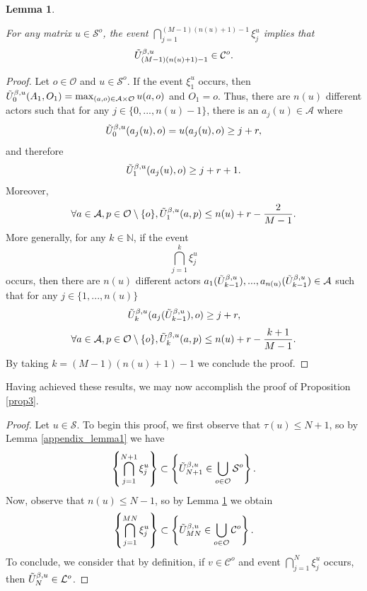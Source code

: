 \documentclass[11pt]{article}
\newtheorem{lemma}[theorem]{Lemma}
\theoremstyle{definition}
\newcommand{\st}{\mathcal{S}}
\newcommand{\A}{\mathcal{A}}
\newcommand{\opn}{\mathcal{O}}
\begin{document}
\begin{lemma}\label{appendix_lemma2}

For any matrix $u\in\st^o$, the event $\bigcap^{(M-1)(n(u) + 1)-1}_{j=1}\xi_j^u$ implies that
$$
    \Tilde{U}^{\beta,u}_{(M-1)(n(u) + 1)-1}\in\mathcal{C}^o.
$$    
\end{lemma}

\begin{proof}
    Let $o \in \mathcal{O}$ and $u \in \mathcal{S}^o$. If the event $\xi_1^u$ occurs, then $\Tilde{U}^{\beta,u}_{0}(A_1,O_1)=\max_{(a,o)\in \A\times \opn} u(a,o)$ and $ O_1=o$. Thus, there are $n(u)$ different actors such that for any $j\in\{0,..., n(u)-1\}$, there is an $a_j(u)\in\mathcal{A}$ where
    $$
        \Tilde{U}^{\beta,u}_{0}(a_j(u),o)=u(a_j(u),o)\geq j + r,
    $$
    and therefore
    $$
        \Tilde{U}^{\beta,u}_{1}(a_j(u),o)\geq j+r+1.
    $$
    Moreover,
    $$
        \forall a\in\mathcal{A}, p\in\mathcal{O}\setminus\{o\}, \Tilde{U}^{\beta,u}_{1}(a,p)\leq n(u) + r -\frac{2}{M-1}.
    $$
    More generally, for any $k\in\mathbb{N}$, if the event
    $$
        \bigcap^k_{j=1}\xi_j^u
    $$
    occurs, then there are $n(u)$ different actors $a_1(\Tilde{U}^{\beta,u}_{k-1}),...,a_{n(u) }(\Tilde{U}^{\beta,u}_{k-1})\in\mathcal{A}$ such that for any $j\in\{1,..., n(u) \}$
    $$
        \Tilde{U}^{\beta,u}_{k}(a_j(\Tilde{U}^{\beta,u}_{k-1}),o)\geq j + r,
    $$
    $$
        \forall a\in\mathcal{A}, p\in\mathcal{O}\setminus\{o\}, \Tilde{U}^{\beta,u}_{k}(a,p)\leq n(u) + r-\frac{k+1}{M-1}.
    $$
  By taking $k=(M-1)(n(u)+ 1)-1$ we conclude the proof.
\end{proof}

Having achieved these results, we may now accomplish the proof of Proposition \ref{prop3}.

\begin{proof}
    Let $u\in\st$. To begin this proof, we first observe that $\tau(u)\leq N+1$, so by Lemma \ref{appendix_lemma1} we have
    $$
        \left\{\bigcap^{N+1}_{j=1}\xi_j^u \right\}\subset \left\{\Tilde{U}^{\beta,u}_{N+1}\in\bigcup_{o\in\mathcal{O}}\st^o \right\}.
    $$
    Now, observe that $n(u)\leq N-1$, so by Lemma \ref{appendix_lemma2} we obtain
    $$
        \left\{\bigcap^{MN}_{j=1}\xi_j^u \right\}\subset \left\{\Tilde{U}^{\beta,u}_{MN}\in\bigcup_{o\in\mathcal{O}}\mathcal{C}^o \right\}.
    $$
    To conclude, we consider that by definition, if $v\in\mathcal{C}^o$ and event $\bigcap^{N}_{j=1}\xi_j^u$ occurs, then $\Tilde{U}^{\beta,u}_{N}\in\mathcal{L}^o$.
\end{proof}
\end{document}

